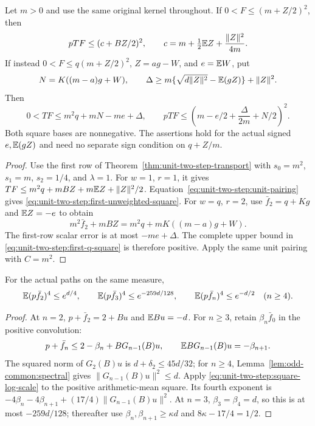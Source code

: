 \begin{corollary}
\label{cor:unit-two-step:first-square}
Let $m>0$ and use the same original kernel throughout.
If $0<F\le(m+Z/2)^2$, then
\begin{equation}\label{eq:unit-two-step:first-unweighted-square}
 pTF\le(c+BZ/2)^2,\qquad
 c=m+\tfrac12\mathbb E Z+\frac{\|Z\|^2}{4m}.
\end{equation}
If instead $0<F\le q(m+Z/2)^2$, $Z=ag-W$, and
$e=\mathbb E W$, put
\[
 N=K((m-a)g+W),\qquad
 \Delta\ge m\{\sqrt{d\|Z\|^2}-\mathbb E(gZ)\}+\|Z\|^2.
\]
Then
\begin{equation}\label{eq:unit-two-step:first-q-square}
 0<TF\le m^2q+mN-me+\Delta,\qquad
 pTF\le\left(m-e/2+\frac\Delta{2m}+N/2\right)^2.
\end{equation}
Both square bases are nonnegative. The assertions hold for the
actual signed $e,\mathbb E(gZ)$ and need no separate sign condition on $q+Z/m$.
\end{corollary}
\begin{proof}
Use the first row of Theorem~\ref{thm:unit-two-step-transport}
with $s_0=m^2$, $s_1=m$, $s_2=1/4$, and $\lambda=1$.
For $w=1$, $r=1$, it gives
$TF\le m^2q+mBZ+m\mathbb E Z+\|Z\|^2/2$.
Equation~\eqref{eq:unit-two-step:unit-pairing} gives
\eqref{eq:unit-two-step:first-unweighted-square}.
For $w=q$, $r=2$, use $\bar f_2=q+Kg$ and
$\mathbb E Z=-e$ to obtain
\[
 m^2\bar f_2+mBZ=m^2q+mK((m-a)g+W).
\]
The first-row scalar error is at most $-me+\Delta$.
The complete upper bound in \eqref{eq:unit-two-step:first-q-square}
is therefore positive. Apply the same unit pairing with $C=m^2$.
\end{proof}

\begin{corollary}\label{cor:unit-two-step:bare-paths}
For the actual paths on the same measure,
\[
 \mathbb E(p\bar f_2)^4\le e^{d/4},\qquad
 \mathbb E(p\bar f_3)^4\le e^{-259d/128},\qquad
 \mathbb E(p\bar f_n)^4\le e^{-d/2}\quad(n\ge4).
\]
\end{corollary}
\begin{proof}
At $n=2$, $p+\bar f_2=2+Bu$ and $\mathbb E Bu=-d$.
For $n\ge3$, retain $\beta_n\bar f_0$ in the positive convolution:
\[
 p+\bar f_n\le2-\beta_n+BG_{n-1}(B)u,
 \qquad \mathbb E BG_{n-1}(B)u=-\beta_{n+1}.
\]
The squared norm of $G_2(B)u$ is $d+\delta_2\le45d/32$;
for $n\ge4$, Lemma~\ref{lem:odd-common:spectral} gives
$\|G_{n-1}(B)u\|^2\le d$.
Apply \eqref{eq:unit-two-step:square-log-scale} to the positive
arithmetic-mean square. Its fourth exponent is
$-4\beta_n-4\beta_{n+1}+(17/4)\|G_{n-1}(B)u\|^2$.
At $n=3$, $\beta_3=\beta_4=d$, so this is at most
$-259d/128$; thereafter use
$\beta_n,\beta_{n+1}\ge\kappa d$ and
$8\kappa-17/4=1/2$.
\end{proof}

